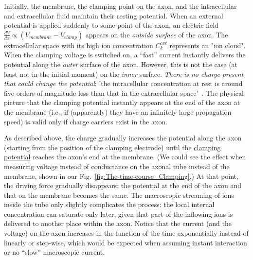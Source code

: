 Initially, the membrane, the clamping point on the
axon, and the intracellular and extracellular fluid maintain
their resting potential. When an external potential %
is applied  suddenly to some point of the axon, an electric field $\frac{dV}{dx}\propto(V_{membrane}-V_{clamp})$
appears on the \emph{outside surface} of the axon. The extracellular
space with its high ion concentration $C_{k}^{ext}$ represents an "ion
cloud".%
When the clamping voltage is switched on, a ``fast'' current
instantly delivers the potential along the \emph{outer} surface of
the axon. However, this is not the case (at least not in the initial
moment) on the \emph{inner} surface. \textit{There is no charge present that could
change the potential}: 'the intracellular concentration at rest is around
five orders of magnitude less than that in the extracellular space'~\cite{KochBiophysics:1999}. The physical picture that the clamping potential
instantly appears at the end of the axon at the membrane (i.e., if (apparently) they
have an infinitely large propagation speed) is valid
only if charge carriers exist in the axon.



As described above, the charge gradually increases the potential along
the axon (starting from the position of the clamping electrode) until
the \hyperlink{voltage-clamping}{clamping potential} reaches the axon's end at the membrane. (We
could see the effect when measuring voltage instead of conductance
on the axonal tube instead of the membrane, shown in our Fig.~\ref{fig:The-time-course_Clamping}.)
At that point, the driving force gradually disappears: the potential
at the end of the axon and that on the membrane becomes the same.
The macroscopic streaming of ions inside the tube only slightly complicates
the process: the local internal concentration can saturate only later,
given that part of the inflowing ions is delivered to another place
within the axon. Notice that the current (and the voltage) on the
axon increases in the function of the time exponentially instead of
linearly or step-wise, which would be expected when assuming instant
interaction or no ``slow'' macroscopic current.


